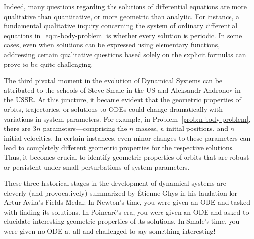 Indeed, many questions regarding the solutions of differential equations are more qualitative than quantitative, or more geometric than analytic. For instance, a fundamental qualitative inquiry concerning the system of ordinary differential equations in~\eqref{eq:n-body-problem} is whether every solution is periodic. In some cases, even when solutions can be expressed using elementary functions, addressing certain qualitative questions based solely on the explicit formulas can prove to be quite challenging.

The third pivotal moment in the evolution of Dynamical Systems can be attributed to the schools of Steve Smale in the US and Aleksandr Andronov in the USSR. At this juncture, it became evident that the geometric properties of orbits, trajectories, or solutions to ODEs could change dramatically with variations in system parameters. For example, in Problem~\ref{prob:n-body-problem}, there are $3n$ parameters—comprising the $n$ masses, $n$ initial positions, and $n$ initial velocities. In certain instances, even minor changes to these parameters can lead to completely different geometric properties for the respective solutions. Thus, it becomes crucial to identify geometric properties of orbits that are robust or persistent under small perturbations of system parameters.

These three historical stages in the development of dynamical systems are cleverly (and provocatively) summarized by Étienne Ghys in his laudation for Artur Avila’s Fields Medal: In Newton's time, you were given an ODE and tasked with finding its solutions. In Poincaré's era, you were given an ODE and asked to elucidate interesting geometric properties of its solutions. In Smale's time, you were given no ODE at all and challenged to say something interesting!
